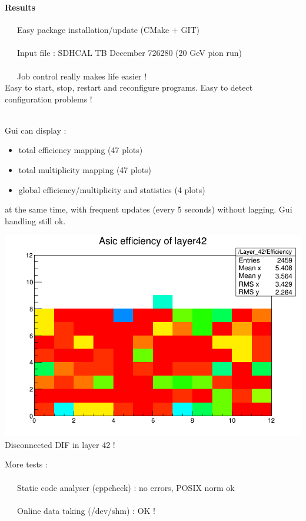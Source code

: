\documentclass[8pt]{beamer}
\begin{document}
  
  \begin{frame}
  \frametitle{\secname}
  \framesubtitle{Results}

  \textbullet ~~ Easy package installation/update (CMake + GIT) \\
  ~ \\
  
  \textbullet ~~ Input file : SDHCAL TB December 726280 (20 GeV pion run) \\
  ~ \\  

  \textbullet ~~ Job control really makes life easier ! \\
  Easy to start, stop, restart and reconfigure programs. Easy to detect configuration problems ! \\
  ~ \\
  \begin{minipage}{0.6\textwidth}
    Gui can display :
    \begin{itemize}
      \item total efficiency mapping (47 plots)
      \item total multiplicity mapping (47 plots)
      \item global efficiency/multiplicity and statistics (4 plots) 
    \end{itemize}

    at the same time, with frequent updates (every 5 seconds) without lagging. Gui handling still ok.
  \end{minipage}
  \begin{minipage}{0.38\textwidth}
    \begin{center}
      \includegraphics[width=\textwidth]{figs/AsicEff42.png} \\
      Disconnected DIF in layer 42 !
    \end{center}
  \end{minipage}
  
  More tests : \\
  ~ \\
  \textbullet ~~ Static code analyser (cppcheck) : no errors, POSIX norm ok \\
  ~ \\
  \textbullet ~~ Online data taking (/dev/shm) : OK ! \\
  ~ \\
  
  \end{frame}
  
\end{document}
